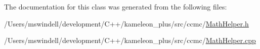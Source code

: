 The documentation for this class was generated from the following files\-:\begin{DoxyCompactItemize}
\item 
/\-Users/mswindell/development/\-C++/kameleon\-\_\-plus/src/ccmc/\hyperlink{_math_helper_8h}{Math\-Helper.\-h}\item 
/\-Users/mswindell/development/\-C++/kameleon\-\_\-plus/src/ccmc/\hyperlink{_math_helper_8cpp}{Math\-Helper.\-cpp}\end{DoxyCompactItemize}
